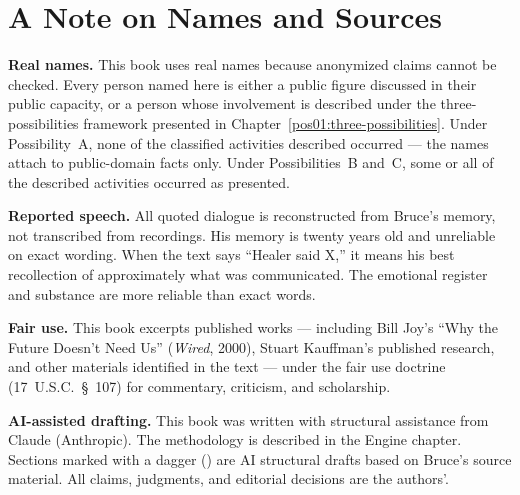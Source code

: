 \chapter*{A Note on Names and Sources}

\textbf{Real names.} This book uses real names because anonymized claims cannot be checked. Every person named here is either a public figure discussed in their public capacity, or a person whose involvement is described under the three-possibilities framework presented in Chapter~\ref{pos01:three-possibilities}. Under Possibility~A, none of the classified activities described occurred --- the names attach to public-domain facts only. Under Possibilities~B and~C, some or all of the described activities occurred as presented.

\textbf{Reported speech.} All quoted dialogue is reconstructed from Bruce's memory, not transcribed from recordings. His memory is twenty years old and unreliable on exact wording. When the text says ``Healer said X,'' it means his best recollection of approximately what was communicated. The emotional register and substance are more reliable than exact words.

\textbf{Fair use.} This book excerpts published works --- including Bill Joy's ``Why the Future Doesn't Need Us'' (\textit{Wired}, 2000), Stuart Kauffman's published research, and other materials identified in the text --- under the fair use doctrine (17~U.S.C.\ \S~107) for commentary, criticism, and scholarship.

\textbf{AI-assisted drafting.} This book was written with structural assistance from Claude (Anthropic). The methodology is described in the Engine chapter. Sections marked with a dagger (\dag) are AI structural drafts based on Bruce's source material. All claims, judgments, and editorial decisions are the authors'.
